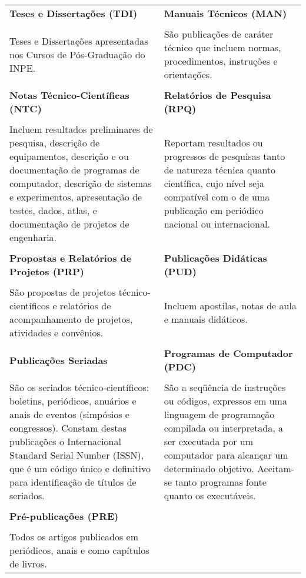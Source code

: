 \begin{table}
\begin{center}
\begin{tabularx}{\textwidth}{X X}
  \textbf{Teses e Disserta\c{c}\~{o}es (TDI)}              & \textbf{Manuais T\'{e}cnicos (MAN)}\\
\\
Teses e Disserta\c{c}\~{o}es apresentadas nos Cursos de P\'{o}s-Gradua\c{c}\~{a}o do INPE.	&
S\~{a}o publica\c{c}\~{o}es de car\'{a}ter t\'{e}cnico que incluem normas, procedimentos, instru\c{c}\~{o}es e orienta\c{c}\~{o}es.\\
\\
\textbf{Notas T\'{e}cnico-Cient\'{i}ficas (NTC)}           & \textbf{Relat\'{o}rios de Pesquisa (RPQ)}\\
\\
Incluem resultados preliminares de pesquisa, descri\c{c}\~{a}o de equipamentos, descri\c{c}\~{a}o e ou documenta\c{c}\~{a}o de programas de computador, descri\c{c}\~{a}o de sistemas e experimentos, apresenta\c{c}\~{a}o de testes, dados, atlas, e documenta\c{c}\~{a}o de projetos de engenharia. 
&	
Reportam resultados ou progressos de pesquisas tanto de natureza t\'{e}cnica quanto cient\'{i}fica, cujo n\'{i}vel seja compat\'{i}vel com o de uma publica\c{c}\~{a}o em peri\'{o}dico nacional ou internacional.\\
\\
\textbf{Propostas e Relat\'{o}rios de Projetos (PRP)}	& \textbf{Publica\c{c}\~{o}es Did\'{a}ticas (PUD)} 
\\
\\
S\~{a}o propostas de projetos t\'{e}cnico-cient\'{i}ficos e relat\'{o}rios de acompanhamento de projetos, atividades e conv\^{e}nios.
&	
Incluem apostilas, notas de aula e manuais did\'{a}ticos. \\
\\         
\textbf{Publica\c{c}\~{o}es Seriadas} 	& \textbf{Programas de Computador (PDC)}\\
\\
S\~{a}o os seriados t\'{e}cnico-cient\'{i}ficos: boletins, peri\'{o}dicos, anu\'{a}rios e anais de eventos (simp\'{o}sios e congressos). Constam destas publica\c{c}\~{o}es o Internacional Standard Serial Number (ISSN), que \'{e} um c\'{o}digo \'{u}nico e definitivo para identifica\c{c}\~{a}o de t\'{i}tulos de seriados. 
&	
S\~{a}o a seq\"{u}\^{e}ncia de instru\c{c}\~{o}es ou c\'{o}digos, expressos em uma linguagem de programa\c{c}\~{a}o compilada ou interpretada, a ser executada por um computador para alcan\c{c}ar um determinado objetivo. Aceitam-se tanto programas fonte quanto os execut\'{a}veis.\\
\\
\textbf{Pr\'{e}-publica\c{c}\~{o}es (PRE)} \\
\\
Todos os artigos publicados em  peri\'{o}dicos, anais e como cap\'{i}tulos de livros. \\                 \end{tabularx}
  \end{center}
 \end{table}
